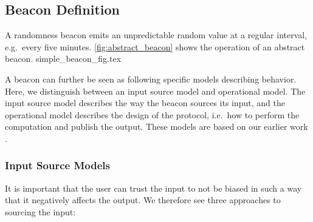 




\subsection{Beacon Definition}

A randomness beacon emits an unpredictable random value at a regular interval, e.g.\ every five minutes. \cref{fig:abstract_beacon} shows the operation of an abstract beacon.
{simple_beacon_fig.tex}

A beacon can further be seen as following specific models describing behavior. Here, we distinguish between an input source model and operational model. The input source model describes the way the beacon sources its input, and the operational model describes the design of the protocol, i.e.\ how to perform the computation and publish the output. These models are based on our earlier work .

\subsubsection{Input Source Models}
It is important that the user can trust the input to not be biased in such a way that it negatively affects the output. We therefore see three approaches to sourcing the input:

